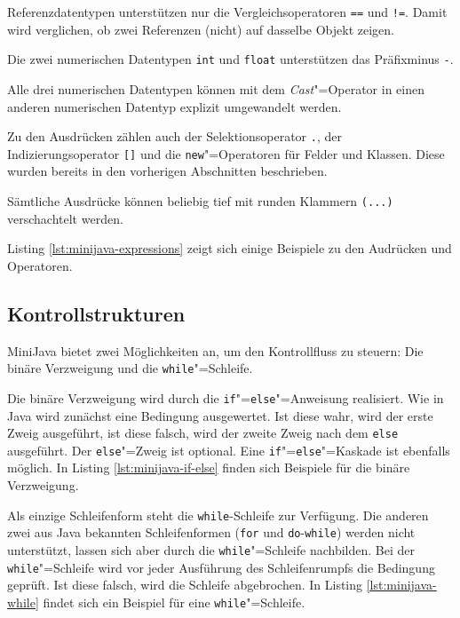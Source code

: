 Referenzdatentypen unterstützen nur die Vergleichsoperatoren \lstinline{==} und \lstinline{!=}. Damit wird verglichen, ob zwei Referenzen (nicht) auf dasselbe Objekt zeigen.

Die zwei numerischen Datentypen \lstinline{int} und \lstinline{float} unterstützen das Präfixminus \lstinline{-}.

Alle drei numerischen Datentypen können mit dem \emph{Cast}"=Operator in einen anderen numerischen Datentyp explizit umgewandelt werden.

Zu den Ausdrücken zählen auch der Selektionsoperator \lstinline{.}, der Indizierungsoperator \lstinline{[]} und die \lstinline{new}"=Operatoren für Felder und Klassen. Diese wurden bereits in den vorherigen Abschnitten beschrieben.

Sämtliche Ausdrücke können beliebig tief mit runden Klammern \lstinline{(...)} verschachtelt werden.

Listing \ref{lst:minijava-expressions} zeigt sich einige Beispiele zu den Audrücken und Operatoren.



\subsection{Kontrollstrukturen}

MiniJava bietet zwei Möglichkeiten an, um den Kontrollfluss zu steuern: Die binäre Verzweigung und die \lstinline{while}"=Schleife.

Die binäre Verzweigung wird durch die \lstinline{if}"=\lstinline{else}"=Anweisung realisiert. Wie in Java wird zunächst eine Bedingung ausgewertet. Ist diese wahr, wird der erste Zweig ausgeführt, ist diese falsch, wird der zweite Zweig nach dem \lstinline{else} ausgeführt. Der \lstinline{else}"=Zweig ist optional. Eine \lstinline{if}"=\lstinline{else}"=Kaskade ist ebenfalls möglich. In Listing \ref{lst:minijava-if-else} finden sich Beispiele für die binäre Verzweigung.

\pagebreak


Als einzige Schleifenform steht die \lstinline{while}-Schleife zur Verfügung. Die anderen zwei aus Java bekannten Schleifenformen (\lstinline{for} und \lstinline{do}-\lstinline{while}) werden nicht unterstützt, lassen sich aber durch die \lstinline{while}"=Schleife nachbilden. Bei der \lstinline{while}"=Schleife wird vor jeder Ausführung des Schleifenrumpfs die Bedingung geprüft. Ist diese falsch, wird die Schleife abgebrochen. In Listing \ref{lst:minijava-while} findet sich ein Beispiel für eine \lstinline{while}"=Schleife.

